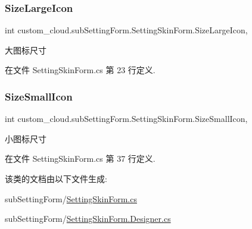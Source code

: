 \subsubsection{\texorpdfstring{Size\+Large\+Icon}{SizeLargeIcon}}
{\footnotesize\ttfamily int custom\+\_\+cloud.\+sub\+Setting\+Form.\+Setting\+Skin\+Form.\+Size\+Large\+Icon\hspace{0.3cm}{\ttfamily [get]}, {\ttfamily [set]}}



大图标尺寸 



在文件 Setting\+Skin\+Form.\+cs 第 23 行定义.

\mbox{\label{classcustom__cloud_1_1sub_setting_form_1_1_setting_skin_form_a0da4ae4b299bf6633a12a963e73efd68}} 
\subsubsection{\texorpdfstring{Size\+Small\+Icon}{SizeSmallIcon}}
{\footnotesize\ttfamily int custom\+\_\+cloud.\+sub\+Setting\+Form.\+Setting\+Skin\+Form.\+Size\+Small\+Icon\hspace{0.3cm}{\ttfamily [get]}, {\ttfamily [set]}}



小图标尺寸 



在文件 Setting\+Skin\+Form.\+cs 第 37 行定义.



该类的文档由以下文件生成\+:\begin{DoxyCompactItemize}
\item 
sub\+Setting\+Form/\hyperlink{_setting_skin_form_8cs}{Setting\+Skin\+Form.\+cs}\item 
sub\+Setting\+Form/\hyperlink{_setting_skin_form_8_designer_8cs}{Setting\+Skin\+Form.\+Designer.\+cs}\end{DoxyCompactItemize}
